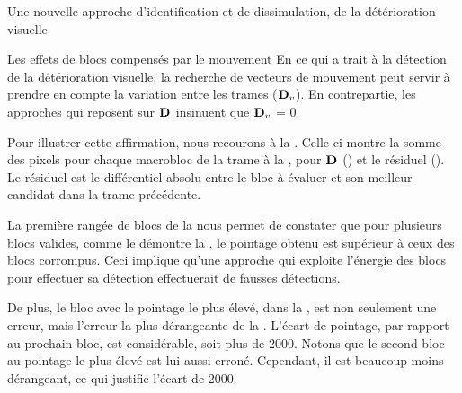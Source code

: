 \begin{chapter}{Une nouvelle approche d'identification et de dissimulation, de
la détérioration visuelle}
\begin{section}{Les effets de blocs compensés par le mouvement}
En ce qui a trait à la détection de la détérioration visuelle, la recherche de
vecteurs de mouvement peut servir à prendre en compte la variation entre les
trames ($\mathbf{D}_{v}$). En contrepartie, les approches qui reposent sur $\mathbf{D}_{}$
insinuent que $\mathbf{D}_{v}$ = 0.

Pour illustrer cette affirmation, nous recourons à la .
Celle-ci montre la somme des pixels pour chaque macrobloc de la trame à la
, pour $\mathbf{D}_{}$ () et le résiduel
(). Le résiduel est le différentiel absolu entre le bloc
à évaluer et son meilleur candidat dans la trame précédente.

La première rangée de blocs de la  nous permet de constater
que pour plusieurs blocs valides, comme le démontre la ,
le pointage obtenu est supérieur à ceux des blocs corrompus. Ceci implique
qu'une approche qui exploite l'énergie des blocs pour effectuer sa détection
effectuerait de fausses détections.

De plus, le bloc avec le pointage le plus élevé, dans la
, est non seulement une erreur, mais l'erreur la plus
dérangeante de la . L'écart de pointage, par rapport au
prochain bloc, est considérable, soit plus de 2000. Notons que le second bloc au
pointage le plus élevé est lui aussi erroné. Cependant, il est beaucoup moins
dérangeant, ce qui justifie l'écart de 2000.


\end{section}
\end{chapter}
